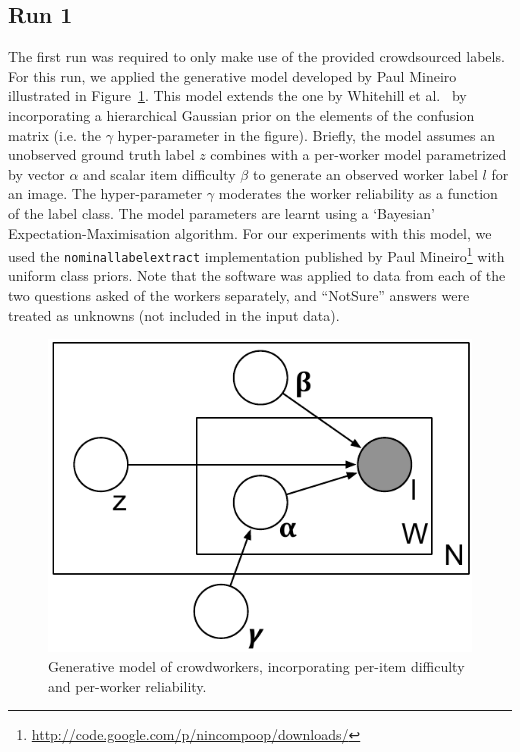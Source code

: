 \documentclass{../acm_proc_article-me11_tweaked}
\begin{document}
\subsection{Run 1}
The first run was required to only make use of the provided crowdsourced labels. For this run, we applied the generative model developed by Paul Mineiro~\cite{Mineiro20110124} illustrated in Figure~\ref{fig:model1}. This model extends the one by Whitehill et al.~\cite{NIPS2009_0100} by incorporating a hierarchical Gaussian prior on the elements of the confusion matrix (i.e. the $\gamma$ hyper-parameter in the figure). Briefly, the model assumes an unobserved ground truth label $z$ combines with a per-worker model parametrized by vector $\alpha$ and scalar item difficulty $\beta$ to generate an observed worker label $l$ for an image. The hyper-parameter $\gamma$ moderates the worker reliability as a function of the label class. The model parameters are learnt using a `Bayesian' Expectation-Maximisation algorithm. For our experiments with this model, we used the \texttt{nominallabelextract} implementation published by Paul Mineiro\footnote{\url{http://code.google.com/p/nincompoop/downloads/}} with uniform class priors. Note that the software was applied to data from each of the two questions asked of the workers separately, and ``NotSure'' answers were treated as unknowns (not included in the input data).

\begin{figure}
	\centering
	\includegraphics[width=0.6\columnwidth]{images/model1}
	\caption{\label{fig:model1}Generative model of crowdworkers, incorporating per-item difficulty and per-worker reliability.}
\end{figure}
\end{document}
